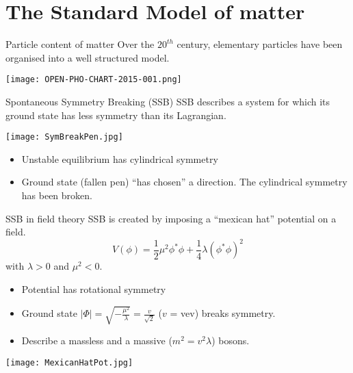 \section{The Standard Model of matter}
\begin{frame}{Particle content of matter}
    Over the $20^{th}$ century, elementary particles have been organised into a well structured model.

  \begin{center} \texttt{[image: OPEN-PHO-CHART-2015-001.png]} \end{center}
\end{frame}
\begin{frame}{Spontaneous Symmetry Breaking (SSB)}
  SSB describes a system for which its ground state has less symmetry than its Lagrangian.

  \texttt{[image: SymBreakPen.jpg]}
  \begin{itemize}
  \item Unstable equilibrium has cylindrical symmetry
  \item Ground state (fallen pen) ``has chosen'' a direction.
    The cylindrical symmetry has been broken.
  \end{itemize}
\end{frame}
\begin{frame}{SSB in field theory}
  SSB is created by imposing a ``mexican hat'' potential on a field.
  \begin{equation}
    \label{eq:orgdea495d}
    V(\phi) = \frac{1}{2}\mu^2\phi^*\phi+\frac{1}{4}\lambda(\phi^*\phi)^2
  \end{equation}
  with  $\lambda>0$ and $\mu^2 <0$.
  
  \begin{minipage}{0.49\linewidth}
  \begin{itemize}
  \item Potential has rotational symmetry
  \item Ground state $|\Phi|=\sqrt{-\frac{\mu^2}{\lambda}}= \frac{v}{\sqrt{2}}$ ($v$ = vev) breaks symmetry.
  \item Describe a massless and a massive ($m^2=v^2\lambda$) bosons.
  \end{itemize}
  \end{minipage}
  \hfill
  \begin{minipage}{0.49\linewidth}
    \texttt{[image: MexicanHatPot.jpg]}
  \end{minipage}
\end{frame}
